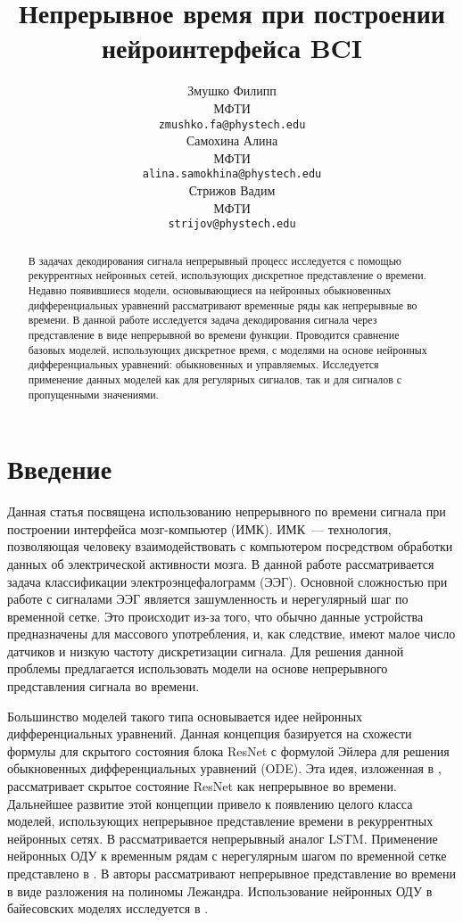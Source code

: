 \documentclass{article}
\title{Непрерывное время при построении нейроинтерфейса BCI}
\author{ Змушко Филипп \\
	МФТИ \\
	\texttt{zmushko.fa@phystech.edu} \\
	\And
	Самохина Алина \\
	МФТИ\\
	\texttt{alina.samokhina@phystech.edu} \\
	\And
	Стрижов Вадим \\
	МФТИ\\
	\texttt{strijov@phystech.edu} \\
}
\date{}
\begin{document}
\maketitle

\begin{abstract}
	В задачах декодирования сигнала непрерывный процесс исследуется с помощью рекуррентных нейронных сетей, использующих дискретное представление о времени. Недавно появившиеся модели, основывающиеся на нейронных обыкновенных дифференциальных уравнений рассматривают временные ряды как непрерывные во времени.
    В данной работе исследуется задача декодирования сигнала через представление в виде непрерывной во времени функции. Проводится сравнение базовых моделей, использующих дискретное время, с моделями на основе нейронных дифференциальных уравнений: обыкновенных и управляемых. Исследуется применение данных моделей как для регулярных сигналов, так и для сигналов с пропущенными значениями. 
\end{abstract}



\section{Введение}
Данная статья посвящена  использованию непрерывного по времени сигнала при построении интерфейса мозг-компьютер (ИМК). ИМК~--- технология, позволяющая человеку взаимодействовать с компьютером посредством обработки данных об электрической активности мозга. В данной работе рассматривается задача классификации электроэнцефалограмм (ЭЭГ). Основной сложностью при работе с сигналами ЭЭГ является зашумленность и нерегулярный шаг по временной сетке. Это происходит из-за того, что обычно данные устройства предназначены для массового употребления, и, как следствие, имеют малое число датчиков и низкую частоту дискретизации сигнала. Для решения данной проблемы предлагается использовать модели на основе непрерывного представления сигнала во времени.

Большинство моделей такого типа основывается идее нейронных дифференциальных уравнений. Данная концепция базируется на схожести формулы для скрытого состояния блока ResNet с формулой Эйлера для решения обыкновенных дифференциальных уравнений (ODE). Эта идея, изложенная в \cite{NEURIPS2018_69386f6b}, рассматривает скрытое состояние ResNet как непрерывное во времени. Дальнейшее развитие этой концепции привело к появлению целого класса моделей, использующих непрерывное представление времени в рекуррентных нейронных сетях. В \cite{lechner2020longterm} рассматривается непрерывный аналог LSTM. Применение нейронных ОДУ к временным рядам с нерегулярным шагом по временной сетке представлено в \cite{cde}. В \cite{NEURIPS2019_952285b9} авторы рассматривают непрерывное представление во времени в виде разложения на полиномы Лежандра. Использование нейронных ОДУ в байесовских моделях исследуется в \cite{NEURIPS2019_99a40143}. 
\end{document}
